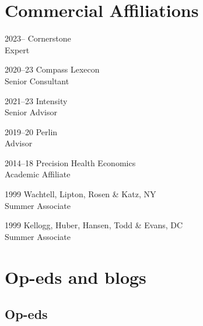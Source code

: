 \documentclass[11pt,letterpaper]{report}
\begin{document}
    \section*{Commercial Affiliations}

    \begin{tablist}

        \item[2023--]   \tab{}Cornerstone \\
                              Expert
    
        \item[2020--23]   \tab{}Compass Lexecon \\
                              Senior Consultant
    
        \item[2021--23]   \tab{}Intensity \\
                              Senior Advisor
    
        \item[2019--20] \tab{}Perlin \\
                              Advisor
    
        \item[2014--18] \tab{}Precision Health Economics \\
                              Academic Affiliate
    
        \item[1999] \tab{}Wachtell, Lipton, Rosen \& Katz, NY \\
                              Summer Associate
                              
        \item[1999] \tab{}Kellogg, Huber, Hansen, Todd \& Evans, DC \\
                              Summer Associate
                              
    \end{tablist}   

    
        
    
    
    \section*{Op-eds and blogs}

    \subsection*{Op-eds}
\end{document}
